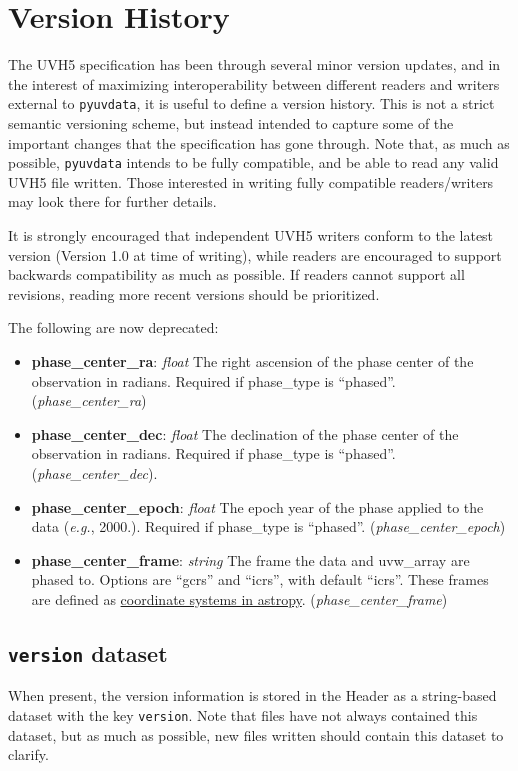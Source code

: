 \documentclass[11pt, oneside]{article}
\begin{document}
\section{Version History}
\label{sec:version_history}
The UVH5 specification has been through several minor version updates, and in
the interest of maximizing interoperability between different readers and
writers external to \verb+pyuvdata+, it is useful to define a version
history. This is not a strict semantic versioning scheme, but instead intended
to capture some of the important changes that the specification has gone
through. Note that, as much as possible, \verb+pyuvdata+ intends to be fully
compatible, and be able to read any valid UVH5 file written. Those interested in
writing fully compatible readers/writers may look there for further details.

It is strongly encouraged that independent UVH5 writers conform to the latest
version (Version 1.0 at time of writing), while readers are encouraged to
support backwards compatibility as much as possible. If readers cannot support
all revisions, reading more recent versions should be prioritized.


The following are now deprecated:
\begin{itemize}
\item \textbf{phase\_center\_ra}: \textit{float} The right ascension of the
  phase center of the observation in radians. Required if phase\_type is
  ``phased''. (\textit{phase\_center\_ra})
\item \textbf{phase\_center\_dec}: \textit{float} The declination of the phase
  center of the observation in radians. Required if phase\_type is
  ``phased''. (\textit{phase\_center\_dec}).
\item \textbf{phase\_center\_epoch}: \textit{float} The epoch year of the phase
  applied to the data (\textit{e.g.}, 2000.). Required if phase\_type is
  ``phased''. (\textit{phase\_center\_epoch})
\item \textbf{phase\_center\_frame}: \textit{string} The frame the data and
  uvw\_array are phased to. Options are ``gcrs'' and ``icrs'', with default
  ``icrs''. These frames are defined as
  \href{https://docs.astropy.org/en/stable/coordinates/index.html}{coordinate
    systems in astropy}. (\textit{phase\_center\_frame})
\end{itemize}


\subsection{\texttt{version} dataset}
When present, the version information is stored in the Header as a string-based
dataset with the key \verb+version+. Note that files have not always contained
this dataset, but as much as possible, new files written should contain this
dataset to clarify.
\end{document}

